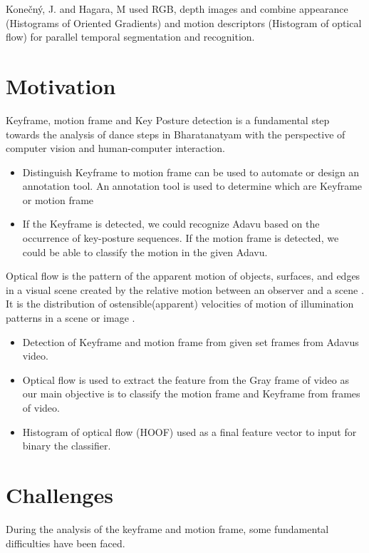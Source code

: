 Konečný, J. and Hagara, M used RGB, depth images and combine appearance (Histograms of Oriented Gradients) and motion descriptors (Histogram of optical flow) for parallel temporal segmentation and recognition. \citep{konevcny2014one}


\newpage
\section{Motivation}
Keyframe, motion frame and Key Posture detection is a fundamental step towards the analysis of dance steps in Bharatanatyam with the perspective of computer vision and human-computer interaction.
\begin{itemize}
    \item Distinguish Keyframe to motion frame can be used to automate or design an annotation tool. An annotation tool is used to determine which are Keyframe or motion frame 
    \item If the Keyframe is detected, we could recognize Adavu based on the occurrence of key-posture sequences. If the motion frame is detected, we could be able to classify the motion in the given Adavu.
\end{itemize}

Optical flow is the pattern of the apparent motion of objects, surfaces, and edges in a visual scene created by the relative motion between an observer and a scene \citep{wiki:003}. It is the distribution of ostensible(apparent) velocities of motion of illumination patterns in a scene or image \citep{wiki:003}.
\begin{itemize}
    \item Detection of Keyframe and motion frame from given set frames from Adavus video.
    \item Optical flow is used to extract the feature from the Gray frame of video as our main objective is to classify the motion frame and Keyframe from frames of video.
    \item Histogram of optical flow (HOOF) used as a final feature vector to input for binary the classifier.

\end{itemize}

\section{Challenges}
During the analysis of the keyframe and motion frame, some fundamental difficulties have been faced.

